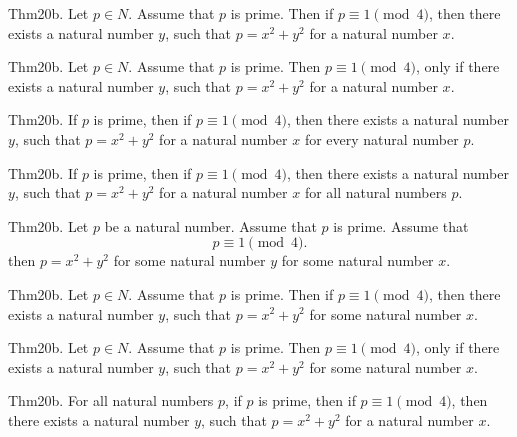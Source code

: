 \documentclass{article}
\begin{document}
Thm20b. Let $p \in N$. Assume that $p$ is prime. Then if $p \equiv 1 \pmod{ 4}$, then there exists a natural number $y$, such that $p = x ^{ 2}+ y ^{ 2}$ for a natural number $x$.

Thm20b. Let $p \in N$. Assume that $p$ is prime. Then $p \equiv 1 \pmod{ 4}$, only if there exists a natural number $y$, such that $p = x ^{ 2}+ y ^{ 2}$ for a natural number $x$.

Thm20b. If $p$ is prime, then if $p \equiv 1 \pmod{ 4}$, then there exists a natural number $y$, such that $p = x ^{ 2}+ y ^{ 2}$ for a natural number $x$ for every natural number $p$.

Thm20b. If $p$ is prime, then if $p \equiv 1 \pmod{ 4}$, then there exists a natural number $y$, such that $p = x ^{ 2}+ y ^{ 2}$ for a natural number $x$ for all natural numbers $p$.

Thm20b. Let $p$ be a natural number. Assume that $p$ is prime. Assume that $$p \equiv 1 \pmod{ 4}.$$ then $p = x ^{ 2}+ y ^{ 2}$ for some natural number $y$ for some natural number $x$.

Thm20b. Let $p \in N$. Assume that $p$ is prime. Then if $p \equiv 1 \pmod{ 4}$, then there exists a natural number $y$, such that $p = x ^{ 2}+ y ^{ 2}$ for some natural number $x$.

Thm20b. Let $p \in N$. Assume that $p$ is prime. Then $p \equiv 1 \pmod{ 4}$, only if there exists a natural number $y$, such that $p = x ^{ 2}+ y ^{ 2}$ for some natural number $x$.

Thm20b. For all natural numbers $p$, if $p$ is prime, then if $p \equiv 1 \pmod{ 4}$, then there exists a natural number $y$, such that $p = x ^{ 2}+ y ^{ 2}$ for a natural number $x$.
\end{document}
